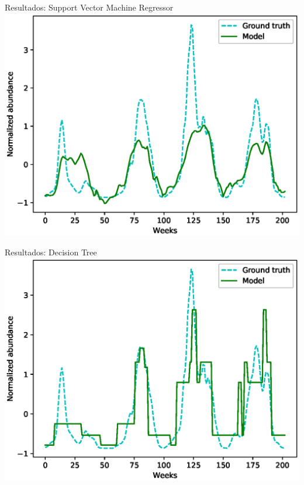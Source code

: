 \documentclass[10pt]{beamer}
\begin{document}
\begin{frame}{Resultados: Support Vector Machine Regressor}
  \includegraphics[width=\textwidth]{svr.eps}
\end{frame}

\begin{frame}{Resultados: Decision Tree}
  \includegraphics[width=\textwidth]{dtr.eps}
\end{frame}
\end{document}
